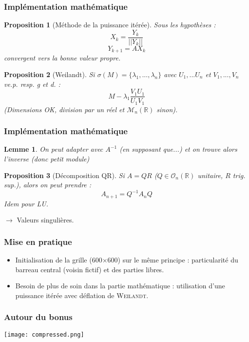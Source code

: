 \documentclass[11pt]{beamer}
\newtheorem{proposition}{Proposition}[section]
\newtheorem{lemme}{Lemme}[section]
\begin{document}
	\begin{frame}
		\frametitle{Implémentation mathématique}
		\begin{proposition}[Méthode de la puissance itérée]
			Sous les hypothèses :
			\[X_k=\frac{Y_k}{||Y_k||}\]
			\[Y_{k+1}=AX_k\]
			convergent vers la bonne valeur propre.
		\end{proposition}
	
		\begin{proposition}[Weilandt]
			Si $\sigma(M)=\{\lambda_1,...,\lambda_n\}$ avec $U_1,...U_n$ et $V_1,...,V_n$ ve.p. resp. g et d. :
			\[M-\lambda_1\frac{V_1U_1}{U_1V_1}\]
			(Dimensions OK, division par un réel et $\mathcal{M}_n(\mathbb{R})$ sinon).
		\end{proposition}
	\end{frame}

	\begin{frame}
		\frametitle{Implémentation mathématique}
		\begin{lemme}
			On peut adapter avec $A^{-1}$ (en supposant que...) et on trouve alors l'inverse (donc petit module)
		\end{lemme}
	
		\begin{proposition}[Décomposition QR]
			Si $A=QR$ ($Q\in\mathcal{O}_n(\mathbb{R})$ unitaire, $R$ trig. sup.), alors on peut prendre :
			\[A_{n+1}=Q^{-1}A_nQ\]
			Idem pour LU.
		\end{proposition}
		$\to$ Valeurs singulières.
	\end{frame}

		\begin{frame}
		\frametitle{Mise en pratique}
		\begin{itemize}
			\item Initialisation de la grille (600$\times$600) sur le même principe : particularité du barreau central (voisin fictif) et des parties libres.
			\item Besoin de plus de soin dans la partie mathématique : utilisation d'une puissance itérée avec déflation de \textsc{Weilandt}. 
		\end{itemize}
	\end{frame}

	\begin{frame}
		\frametitle{Autour du bonus}
		\centering
		\texttt{[image: compressed.png]}
	\end{frame}
\end{document}
